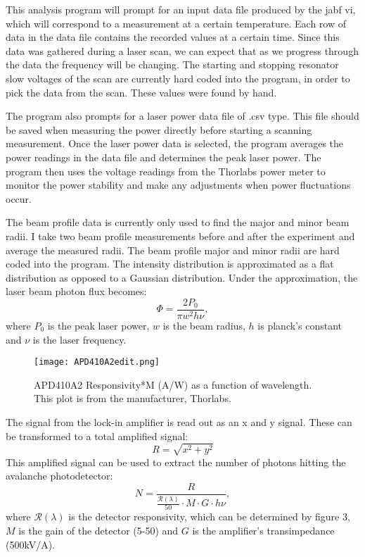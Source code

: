\documentclass[12pt, a4paper]{article}
\begin{document}
This analysis program will prompt for an input data file produced by the jabf vi, which will correspond to a measurement at a certain temperature. Each row of data in the data file contains the recorded values at a certain time. Since this data was gathered during a laser scan, we can expect that as we progress through the data the frequency will be changing. The starting and stopping resonator slow voltages of the scan are currently hard coded into the program, in order to pick the data from the scan. These values were found by hand. 

The program also prompts for a laser power data file of .csv type. This file should be saved when measuring the power directly before starting a scanning measurement. Once the laser power data is selected, the program averages the power readings in the data file and determines the peak laser power. The program then uses the voltage readings from the Thorlabs power meter to monitor the power stability and make any adjustments when power fluctuations occur. 

The beam profile data is currently only used to find the major and minor beam radii. I take two beam profile measurements before and after the experiment and average the measured radii.  The beam profile major and minor radii are hard coded into the program. The intensity distribution is approximated as a flat distribution as opposed to a Gaussian distribution. Under the approximation, the laser beam photon flux becomes:
\begin{equation}
\Phi = \frac{2P_0}{\pi w^2 h \nu},
\end{equation}
where $P_0$ is the peak laser power, $w$ is the beam radius, $h$ is planck's constant and $\nu$ is the laser frequency.

\begin{wrapfigure}{r}{0.45\textwidth}
  \texttt{[image: APD410A2edit.png]}
  \vspace*{-3mm}
  \caption{APD410A2 Responsivity*M (A/W) as a function of wavelength. This plot is from the manufacturer, Thorlabs.}
\end{wrapfigure}

The signal from the lock-in amplifier is read out as an x and y signal. These can be transformed to a total amplified signal:
\begin{equation}
R = \sqrt{x^2+y^2}
\end{equation}
This amplified signal can be used to extract the number of photons hitting the avalanche photodetector:
\begin{equation}
N = \frac{R}{\frac{\mathcal{R}(\lambda)}{50}\cdot M\cdot G \cdot h\nu},
\end{equation}
where $\mathcal{R}(\lambda)$ is the detector responsivity, which can be determined by figure 3, $M$ is the gain of the detector (5-50) and $G$ is the amplifier's transimpedance (500kV/A).
\end{document}
